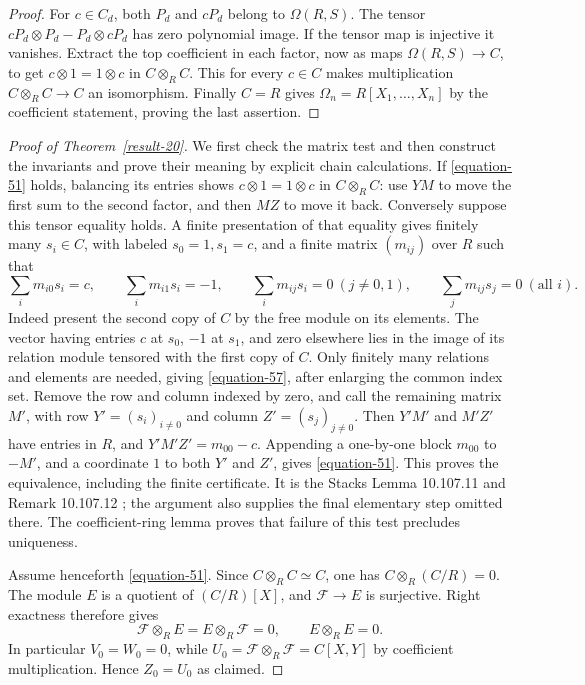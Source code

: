\documentclass[11pt,a4paper]{article}
\theoremstyle{definition}
\begin{document}
\begin{proof}
For $c\in C_d$, both $P_d$ and $cP_d$ belong
to $\Omega(R,S)$. The tensor
$cP_d\otimes P_d-P_d\otimes cP_d$ has zero
polynomial image. If the tensor map is
injective it vanishes. Extract the top
coefficient in each factor, now as maps
$\Omega(R,S)\to C$, to get
$c\otimes1=1\otimes c$ in $C\otimes_R C$.
This for every $c\in C$ makes multiplication
$C\otimes_R C\to C$ an isomorphism.
Finally $C=R$ gives $\Omega_n=R[X_1,\ldots,X_n]$
by the coefficient statement, proving the
last assertion.
\end{proof}\begin{proof}[Proof of Theorem~\ref{result-20}]
We first check the matrix test and then construct the invariants and
prove their meaning by explicit chain calculations.
If \eqref{equation-51} holds, balancing its entries shows
$c\otimes1=1\otimes c$ in $C\otimes_R C$: use $YM$ to move the first
sum to the second factor, and then $MZ$ to move it back.
Conversely suppose this tensor equality holds. A finite presentation
of that equality gives finitely many $s_i\in C$, with labeled
$s_0=1,s_1=c$, and a finite matrix $(m_{ij})$ over $R$ such that
\begin{equation}
 \sum_i m_{i0}s_i=c,\qquad \sum_i m_{i1}s_i=-1,
 \qquad \sum_i m_{ij}s_i=0\ (j\ne0,1),\qquad
                       \sum_jm_{ij}s_j=0\ (\text{all }i).
                                                        \label{equation-57}
\end{equation}
Indeed present the second copy of $C$ by the free module on its
elements. The vector having entries $c$ at $s_0$, $-1$ at $s_1$,
and zero elsewhere lies in the image of its relation module tensored
with the first copy of $C$. Only finitely many relations and elements
are needed, giving \eqref{equation-57}, after enlarging the common index set.
Remove the row and column indexed by zero, and call the remaining
matrix $M'$, with row $Y'=(s_i)_{i\ne0}$ and column
$Z'=(s_j)_{j\ne0}$. Then $Y'M'$ and $M'Z'$ have entries in $R$,
and $Y'M'Z'=m_{00}-c$. Appending a one-by-one block $m_{00}$ to
$-M'$, and a coordinate $1$ to both $Y'$ and $Z'$, gives \eqref{equation-51}.
This proves the equivalence, including the finite certificate.
It is the Stacks Lemma 10.107.11 and Remark 10.107.12
\cite{StacksEpicMatrices};
the argument also supplies the final elementary step omitted there.
The coefficient-ring lemma proves that failure of this test precludes uniqueness.

Assume henceforth \eqref{equation-51}. Since $C\otimes_R C\simeq C$, one has
$C\otimes_R(C/R)=0$. The module $E$ is a quotient of $(C/R)[X]$,
and $\mathcal F\to E$ is surjective. Right exactness therefore gives
\begin{equation}
 \mathcal F\otimes_R E=E\otimes_R\mathcal F=0,
                         \qquad E\otimes_R E=0.          \label{equation-58}
\end{equation}
In particular $V_0=W_0=0$, while
$U_0=\mathcal F\otimes_R\mathcal F=C[X,Y]$ by coefficient
multiplication. Hence $Z_0=U_0$ as claimed.


\end{proof}
\end{document}
